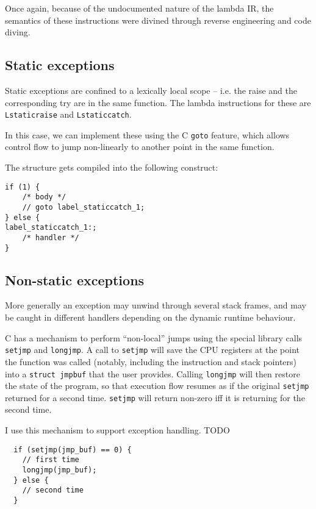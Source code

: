 \documentclass[12pt,a4paper,twoside,openright]{report}
\begin{document}
Once again, because of the undocumented nature of the lambda IR, the semantics
of these instructions were divined through reverse engineering and code diving.

\subsection{Static exceptions}

Static exceptions are confined to a lexically local scope -- i.e. the raise and
the corresponding try are in the same function. The lambda instructions for
these are \lstinline!Lstaticraise! and \lstinline!Lstaticcatch!.

In this case, we can implement these using the C \lstinline!goto! feature,
which allows control flow to jump non-linearly to another point in the same
function.

The structure gets compiled into the following construct:

\begin{lstlisting}
if (1) {
    /* body */
    // goto label_staticcatch_1;
} else {
label_staticcatch_1:;
    /* handler */
}
\end{lstlisting}

\subsection{Non-static exceptions}

More generally an exception may unwind through several stack frames, and may be
caught in different handlers depending on the dynamic runtime behaviour.

C has a mechanism to perform ``non-local'' jumps using the special library
calls \lstinline!setjmp! and \lstinline!longjmp!. A call to \lstinline!setjmp!
will save the CPU registers at the point the function was called (notably,
including the instruction and stack pointers) into a \lstinline!struct jmpbuf!
that the user provides. Calling \lstinline!longjmp! will then restore the state
of the program, so that execution flow resumes as if the original
\lstinline!setjmp! returned for a second time. \lstinline!setjmp! will return
non-zero iff it is returning for the second time.

I use this mechanism to support exception handling. TODO

\begin{lstlisting}
  if (setjmp(jmp_buf) == 0) {
    // first time
    longjmp(jmp_buf);
  } else {
    // second time
  }
\end{lstlisting}
\end{document}
